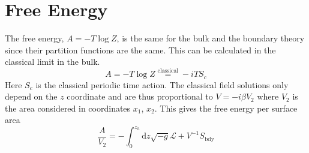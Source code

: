 \documentclass[12pt]{report}
\renewcommand{\d}{\ensuremath{\mathrm{d}}}
\renewcommand{\L}{\ensuremath{\mathcal{L}}}
\renewcommand{\i}{\ensuremath{i}}
\begin{document}
\section{Free Energy}
The free energy, $A=-T\log{Z}$, is the same for the bulk and the boundary theory since their partition functions are the same. This can be calculated in the classical limit in the bulk.
\begin{equation}
 A=-T\log{Z}\stackrel{\mathrm{classical}}{=}-\i T S_c
\end{equation}
Here $S_c$ is the classical periodic time action. The classical field solutions only depend on the $z$ coordinate and are thus proportional to $V=-\i\beta V_2$ where $V_2$ is the area considered in coordinates $x_1$, $x_2$. This gives the free energy per surface area
\begin{equation}
 \frac{A}{V_2}=-\int_0^{z_h}\d z \sqrt{-g}\L+V^{-1}S_{\mathrm{bdy}}
\end{equation}
\end{document}
